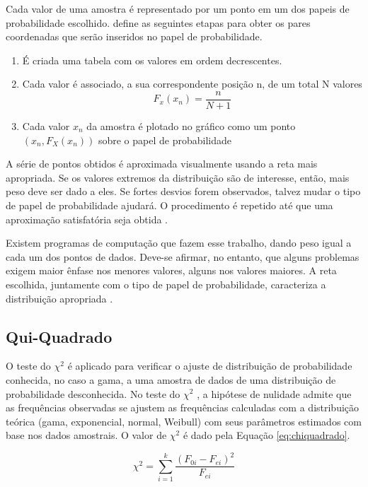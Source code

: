 Cada valor de uma amostra é representado por um ponto em um dos papeis de probabilidade escolhido.  define as seguintes etapas para obter os pares coordenadas que serão inseridos no papel de probabilidade.

\begin{enumerate}
    \item É criada uma tabela com os valores em ordem decrescentes.
    \item Cada valor é associado, a sua correspondente posição n, de um total N valores 
        \begin{equation}
            F_x(x_n) = \frac{n}{N+1}
        \end{equation}
    \item Cada valor $x_n$ da amostra é plotado no gráfico como um ponto $(x_n,F_X(x_n))$ sobre o papel de probabilidade
\end{enumerate}

A série de pontos obtidos é aproximada visualmente usando a reta mais apropriada. Se os valores extremos da distribuição são de interesse, então, mais peso deve ser dado a eles. Se fortes desvios forem observados, talvez mudar o tipo de papel de probabilidade ajudará. O procedimento é repetido até que uma aproximação satisfatória seja obtida \cite{papel}.

Existem programas de computação que fazem esse trabalho, dando peso igual a cada um dos pontos de dados. Deve-se afirmar, no entanto, que alguns problemas exigem maior ênfase nos menores valores, alguns nos valores maiores. A reta escolhida, juntamente com o tipo de papel de probabilidade, caracteriza a distribuição apropriada \cite{papel}.

\subsection{Qui-Quadrado}

O teste do $\chi^2$ é aplicado para verificar o ajuste de distribuição de probabilidade conhecida, no caso a gama, a uma amostra de dados de uma distribuição de probabilidade desconhecida. No teste do $\chi^2$ , a hipótese de nulidade admite que as frequências observadas se ajustem as frequências calculadas com a distribuição teórica (gama, exponencial, normal, Weibull) com seus parâmetros estimados com base nos dados amostrais. O valor de $\chi^2$ é dado pela Equação \ref{eq:chiquadrado}.

\begin{equation}[h]
\label{eq:chiquadrado}
    \chi^2=\sum_{i=1}^{k} \frac{(F_{0i}-F_{ei})^2}{F_{ei}}
\end{equation}


